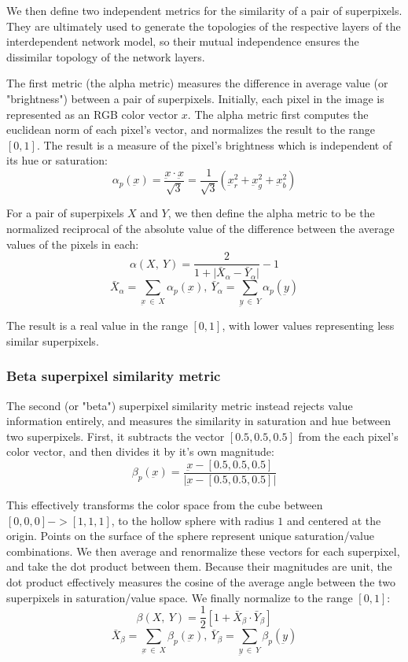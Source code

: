 \documentclass[twocolumn]{article}
\begin{document}
We then define two independent metrics for the similarity of a pair of superpixels. They are ultimately used to generate the topologies of the respective layers of the interdependent network model, so their mutual independence ensures the dissimilar topology of the network layers.

The first metric (the alpha metric) measures the difference in average value (or "brightness") between a pair of superpixels. Initially, each pixel in the image is represented as an RGB color vector $x$. The alpha metric first computes the euclidean norm of each pixel's vector, and normalizes the result to the range $[0, 1]$. The result is a measure of the pixel's brightness which is independent of its hue or saturation:
\[
    \alpha_p(\underbar{x}) = \frac{\underbar{x} \cdot \underbar{x}}{\sqrt{3}} = \frac{1}{\sqrt{3}}(\underbar{x}_r^2+\underbar{x}_g^2+\underbar{x}_b^2)
\]

For a pair of superpixels $X$ and $Y$, we then define the alpha metric to be the normalized reciprocal of the absolute value of the difference between the average values of the pixels in each:
\[
    \alpha(X,\: Y) = \frac{2}{1 + \lvert \bar{X}_\alpha - \bar{Y}_\alpha \rvert} - 1
\]
\[
    \bar{X}_\alpha = \sum\limits_{\underbar{x}\: \in\: X} \alpha_p(\underbar{x}),\ \bar{Y}_\alpha = \sum\limits_{\underbar{y}\: \in\: Y} \alpha_p(\underbar{y})
\]

The result is a real value in the range $[0, 1]$, with lower values representing less similar superpixels.

\subsubsection{Beta superpixel similarity metric}

The second (or "beta") superpixel similarity metric instead rejects value information entirely, and measures the similarity in saturation and hue between two superpixels. First, it subtracts the vector $[0.5, 0.5, 0.5]$ from the each pixel's color vector, and then divides it by it's own magnitude:
\[
    \beta_p(\underbar{x}) = \frac{\underbar{x} - [0.5, 0.5, 0.5]}{\lvert \underbar{x} - [0.5, 0.5, 0.5] \rvert}
\]

This effectively transforms the color space from the cube between $[0, 0, 0] -> [1, 1, 1]$, to the hollow sphere with radius $1$ and centered at the origin. Points on the surface of the sphere represent unique saturation/value combinations. We then average and renormalize these vectors for each superpixel, and take the dot product between them. Because their magnitudes are unit, the dot product effectively measures the cosine of the average angle between the two superpixels in saturation/value space. We finally normalize to the range $[0, 1]$:
\[
    \beta(X,\: Y) = \frac{1}{2}[1 + \bar{X}_\beta \cdot \bar{Y}_\beta]
\]
\[
    \bar{X}_\beta = \sum\limits_{\underbar{x}\: \in\: X} \beta_p(\underbar{x}),\ \bar{Y}_\beta = \sum\limits_{\underbar{y}\: \in\: Y} \beta_p(\underbar{y})
\]
\end{document}

